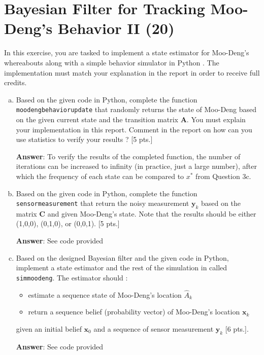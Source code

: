\section{ Bayesian Filter for Tracking Moo-Deng's Behavior II (20)}
In this exercise, you are tasked to implement a state estimator for Moo-Deng's whereabouts along with a simple behavior simulator in Python . The implementation must match your explanation in the report in order to receive full credits.
\begin{enumerate}[a)]
\item Based on the given code in Python, complete the function  \texttt{moodeng\textunderscore behavior\textunderscore update} that randomly returns the state of Moo-Deng based on the given current state and the transition matrix $\mathbf{A}$. 
You must explain your implementation in this report. Comment in the report on how can you use statistics to verify your results ? [5 pts.]

\textbf{Answer}: To verify the results of the completed function, the number of iterations can be increased to infinity (in practice, just a large number), after which the frequency of each state can be compared to $x^*$ from Question 3c.
\item Based on the given code in Python, complete the function \texttt{sensor\textunderscore measurement}  that return the noisy measurement $\mathbf{y}_k$ based on the matrix $\mathbf{C}$ and given Moo-Deng's state. Note that the results should be either (1,0,0), (0,1,0), or (0,0,1). [5 pts.]

\textbf{Answer}: See code provided
\item Based on the designed Bayesian filter and the given code in Python, implement a state estimator and the rest of the simulation in  called \texttt{sim\textunderscore moodeng}. The estimator should :
\begin{itemize}
    \item estimate a sequence state of Moo-Deng's location $\hat{A}_k$
    \item return a sequence belief (probability vector) of Moo-Deng's location $\mathbf{x}_k$
\end{itemize} 
given an initial belief $\mathbf{x}_0$ and a sequence of sensor measurement $\mathbf{y}_k$ [6 pts.]. 

\textbf{Answer}: See code provided
\end{enumerate}

